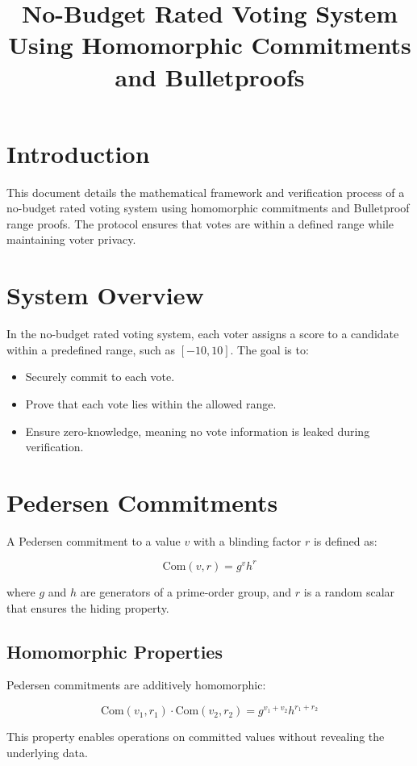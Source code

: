 \documentclass{article}
\title{No-Budget Rated Voting System Using Homomorphic Commitments and Bulletproofs}
\author{}
\date{}
\begin{document}
\maketitle

\section{Introduction}
This document details the mathematical framework and verification process of a no-budget rated voting system using homomorphic commitments and Bulletproof range proofs. The protocol ensures that votes are within a defined range while maintaining voter privacy.

\section{System Overview}
In the no-budget rated voting system, each voter assigns a score to a candidate within a predefined range, such as \([-10, 10]\). The goal is to:
\begin{itemize}
    \item Securely commit to each vote.
    \item Prove that each vote lies within the allowed range.
    \item Ensure zero-knowledge, meaning no vote information is leaked during verification.
\end{itemize}

\section{Pedersen Commitments}
A Pedersen commitment to a value \( v \) with a blinding factor \( r \) is defined as:

\[
\text{Com}(v, r) = g^v h^r
\]

where \( g \) and \( h \) are generators of a prime-order group, and \( r \) is a random scalar that ensures the hiding property.

\subsection{Homomorphic Properties}
Pedersen commitments are additively homomorphic:

\[
\text{Com}(v_1, r_1) \cdot \text{Com}(v_2, r_2) = g^{v_1 + v_2} h^{r_1 + r_2}
\]

This property enables operations on committed values without revealing the underlying data.
\end{document}

